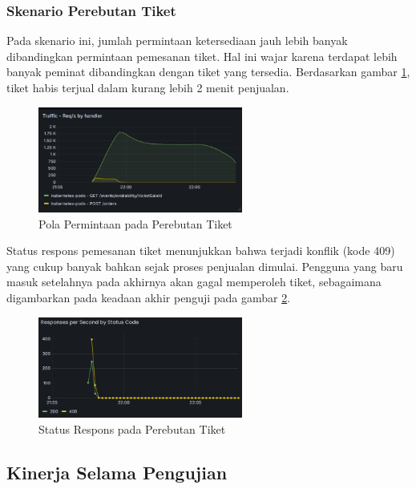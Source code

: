 \pagebreak

\subsubsection{Skenario Perebutan Tiket}

Pada skenario ini, jumlah permintaan ketersediaan jauh lebih banyak dibandingkan permintaan pemesanan tiket. Hal ini wajar karena terdapat lebih banyak peminat dibandingkan dengan tiket yang tersedia. Berdasarkan gambar \ref{fig:pattern-sim-traffic}, tiket habis terjual dalam kurang lebih 2 menit penjualan.


\begin{figure}[htbp]
    \centering
    \includegraphics[width=0.6\textwidth]{resources/chapter-4/pattern-sim-traffic.png}
    \caption{Pola Permintaan pada Perebutan Tiket}
    \label{fig:pattern-sim-traffic}
\end{figure}

Status respons pemesanan tiket menunjukkan bahwa terjadi konflik (kode 409) yang cukup banyak bahkan sejak proses penjualan dimulai. Pengguna yang baru masuk setelahnya pada akhirnya akan gagal memperoleh tiket, sebagaimana digambarkan pada keadaan akhir penguji pada gambar \ref{fig:pattern-sim-order}.

\begin{figure}[htbp]
    \centering
    \includegraphics[width=0.6\textwidth]{resources/chapter-4/pattern-sim-order.png}
    \caption{Status Respons pada Perebutan Tiket}
    \label{fig:pattern-sim-order}
\end{figure}


\subsection{Kinerja Selama Pengujian}

